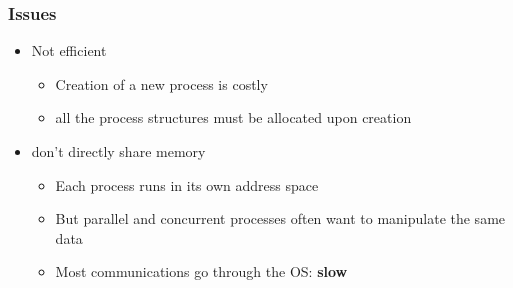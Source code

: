 \documentclass[11pt]{article}
\theoremstyle{definition}
\begin{document}
            \subsubsection{Issues}
                \begin{itemize}
                    \item Not efficient
                        \begin{itemize}
                            \item Creation of a new process is costly
                            \item all the process structures must be allocated upon creation
                        \end{itemize}
                    \item don't directly share memory
                        \begin{itemize}
                            \item Each process runs in its own address space
                            \item But parallel and concurrent processes often want to manipulate the same data
                            \item Most communications go through the OS: \textbf{slow}
                        \end{itemize}
                \end{itemize}
\end{document}
